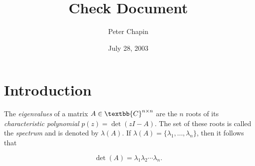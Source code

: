 \documentclass{article}
\begin{document}
\title{Check Document}
\author{Peter Chapin}
\date{July 28, 2003}
\maketitle

\section{Introduction}

The \emph{eigenvalues} of a matrix $A \in \textbb{C}^{n \times n}$ are
the $n$ roots of its \emph{characteristic polynomial} $p(z) = \det(zI -
A)$. The set of these roots is called the \emph{spectrum} and is denoted
by $\lambda(A)$. If $\lambda(A) = \{\lambda_1, \ldots, \lambda_n\}$,
then it follows that

\begin{displaymath}
  \det(A) = \lambda_1 \lambda_2 \cdots \lambda_n .
\end{displaymath}
\end{document}
